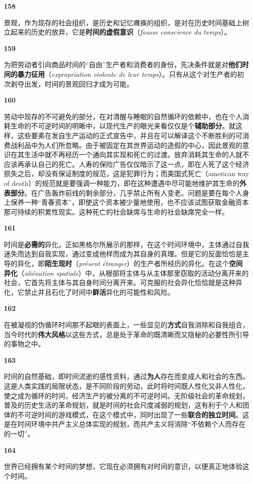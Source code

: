 \documentclass[fontset=fandol, a4paper, 12pt, openright]{ctexbook}
\makeatletter
\newcommand{\thesis}[1]{%
    \par\vspace{1.5em}%
    {\centering \textbf{\Large #1}\par}%
    \nobreak\vspace{0.5em}\nobreak
    \@afterindenttrue %
    \@afterheading    %
}
\makeatother
\begin{document}
\thesis{158}
景观，作为现存的社会组织，是历史和记忆瘫痪的组织，是对在历史时间基础上树立起来的历史的放弃，它是\textbf{时间的虚假意识}（\textit{fausse conscience du temps}）。

\thesis{159}
为把劳动者引向商品时间的“自由”生产者和消费者的身份，先决条件就是对\textbf{他们时间的暴力征用}（\textit{expropriation violente de leur temps}）。只有从这个对生产者的初次剥夺出发，时间的景观回归才成为可能。

\thesis{160}
劳动中现存的不可避免的部分，在对清醒与睡眠的自然循环的依赖中，也在个人消耗生命的不可逆时间的明晰中，以现代生产的眼光来看仅仅是个\textbf{辅助部分}。就这样，这些要素在发自生产运动的正式宣告中，并且在可以解译这个不断胜利的可消费战利品中为人们所忽略。由于被固定在其世界运动的造假的中心，因此景观的意识在其生活中就不再经历一个通向其实现和死亡的过渡。放弃消耗其生命的人就不应该再承认自己的死亡。人寿的保险广告仅仅暗示了这一点，即在人死了这个经济损失之后，却没有保证制度的规范，这是犯罪行为；而美国式死亡（american way of death）的规范就是要强调一种能力，即在这种遭遇中尽可能地维护其生命的\textbf{外表部分}。在广告轰炸前线的剩余部分，几乎禁止所有人变老。问题是要在每个人身上保养一种“青春资本”，即使这个资本被少量地使用，也不应该试图获取金融资本那可持续的积累性现实。这种死亡的社会缺席与生命的社会缺席完全一样。

\thesis{161}
时间是\textbf{必需的}异化，正如黑格尔所展示的那样，在这个时间环境中，主体通过自我迷失而达到自我实现，通过变成他样而成为其自身的真理。但是它的反面恰恰是主导的异化，即\textbf{陌生现时}（\textit{présent étranger}）的生产者所经历的异化。在这个\textbf{空间异化}（\textit{aliénation spatiale}）中，从根部将主体与从主体那里窃取的活动分离开来的社会，它首先将主体与其自身时间分离开来。可克服的社会异化恰恰就是这种异化，它禁止并且石化了时间中\textbf{鲜活}异化的可能性和风险。

\thesis{162}
在被凝视的伪循环时间那不起眼的表面上，一些显见的\textbf{方式}自我消除和自我组合，当今时代的\textbf{伟大风格}以这些方式，总是处于革命的既清晰而又隐秘的必要性所引导的事物之中。

\thesis{163}
时间的自然基础，即时间流逝的感性资料，通过\textbf{为人}存在而变成人和社会的东西。这是人类实践的局限状态，是不同阶段的劳动，此时将时间既人性化又非人性化，使之成为循环的时间，经济生产的被分离的不可逆时间。无阶级社会的革命规划，普及的历史生活的革命规划，就是时间的社会尺度减弱的规划，这有利于个人和团体的不可逆时间的游戏模式，在这个模式中，同时出现了一些\textbf{联合的独立时间}。这是在时间环境中共产主义总体实现的规划，而共产主义将消除“不依赖个人而存在的一切”。

\thesis{164}
世界已经拥有某个时间的梦想，它现在必须拥有对时间的意识，以便真正地体验这个时间。
\end{document}
